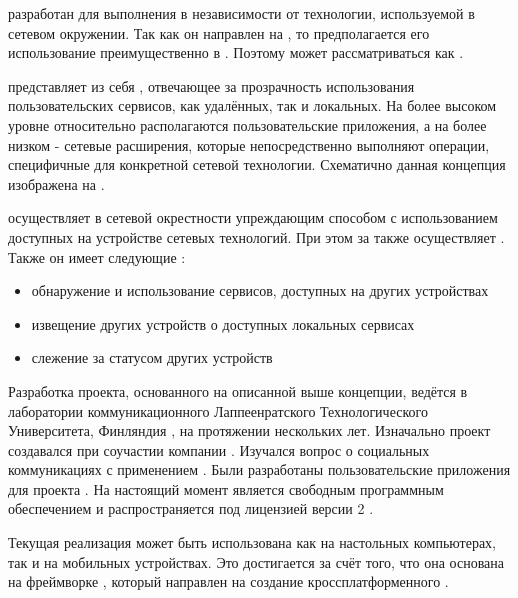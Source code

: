 %
 разработан для выполнения  в независимости от технологии, используемой в сетевом окружении.
%
Так как он направлен на , то предполагается его использование преимущественно в .
%
Поэтому  может рассматриваться как  
.

%
 представляет из себя , отвечающее за прозрачность использования пользовательских сервисов, как удалённых, так и локальных.
%
На более высоком уровне относительно  располагаются пользовательские приложения, а на более низком - сетевые расширения, которые непосредственно выполняют операции, специфичные для конкретной сетевой технологии.
%
Схематично данная концепция изображена на .


%
 осуществляет  в сетевой окрестности упреждающим способом с использованием доступных на устройстве сетевых технологий.
%
При этом за  также осуществляет .
%
Также он имеет следующие  :
\begin{itemize}
	\item обнаружение и использование сервисов, доступных на других устройствах
	\item извещение других устройств о доступных локальных сервисах
	\item слежение за статусом других устройств
\end{itemize}

%
Разработка проекта, основанного на описанной выше концепции, ведётся в лаборатории коммуникационного  Лаппеенратского Технологического Университета, Финляндия , на протяжении нескольких лет.
%
Изначально проект создавался при соучастии компании  . 
%
Изучался вопрос о социальных коммуникациях с применением  .
%
Были разработаны пользовательские приложения для проекта   .
%
На настоящий момент  является свободным программным обеспечением и распространяется под лицензией  версии 2  .

%
Текущая реализация  может быть использована как на настольных компьютерах, так и на мобильных устройствах. 
%
Это достигается за счёт того, что она основана на фреймворке  , который направлен на создание кроссплатформенного .